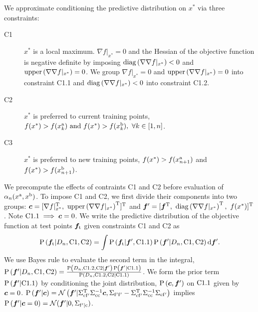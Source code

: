 We approximate conditioning the predictive distribution on $x^*$ via three
constraints: 
\begin{description} 
    \item[C1] $x^*$ is a local maximum. $\nabla f|_{x^*} = 0$ and the
    Hessian of the objective function is negative definite by imposing
    $\func{diag}{\nabla \nabla f|_{x^*}} < 0$ and $\func{upper}{\nabla
    \nabla f|_{x^*}} = 0$. We group $\nabla f|_{x^*} = 0$ and
    $\func{upper}{\nabla \nabla f|_{x^*}} = 0$ into constraint C1.1 and
    $\func{diag}{\nabla \nabla f|_{x^*}} < 0$ into constraint C1.2.

    \item[C2] $x^*$ is preferred to current training points, $f(x^*) >
    f(x_k^{\mathrm{a}}) \textrm{ and }  f(x^*) > f(x_k^{\mathrm{b}}), \ \forall k \in [1,
    n]$.

    \item[C3] $x^*$ is preferred to new training points, $f(x^*) >
    f(x_{n+1}^{\mathrm{a}})$ and $f(x^*) > f(x_{n+1}^{\mathrm{b}})$.  
\end{description}

We precompute the effects of contraints C1 and C2 before evaluation of
$\funcil{\alpha}[n]{x^\tn{a}, x^\tn{b}}$. To impose C1 and C2, we first divide
their components into two groups: $\vecf{c} = [\nabla f|_{x^*}^\tn{T}, \
\func{upper}{\nabla \nabla f|_{x^*}}^\tn{T}]^\tn{T}$ and $\vecf{f}' =
[\vecf{f}^\tn{T},\ \func{diag}{\nabla \nabla f|_{x^*}}^\tn{T},\
f(x^*)]^\tn{T}$. Note $\tn{C1.1} \implies \vecf{c} = 0$. We write the predictive
distribution of the objective function at test points $\vecf{f}[\tn{t}]$ given
constraints C1 and C2 as
\begin{align}
    \prob{\vecf{f}[\tn{t}]|D_n, \tn{C1},\tn{C2}} = 
    \int\prob{\vecf{f}[\tn{t}]| \vecf{f}', \tn{C1.1}}  
    \prob{\vecf{f}' | D_n, \tn{C1}, \tn{C2}} \tn{d}\vecf{f}'.
    \label{eq:predictive_w_constraints}
\end{align}
We use Bayes rule to evaluate the second term in the integral, $\prob{\vecf{f}'
| D_n, \tn{C1}, \tn{C2}} = \frac{\prob{D_n , \tn{C1.2}, \tn{C2} |\vecf{f}'}
\prob{\vecf{f}'| \tn{C1.1}}}{\prob{D_n, \tn{C1.2}, \tn{C2} | \tn{C1.1}}}$. We
form the prior term $\prob{\vecf{f}'|\tn{C1.1}}$ by conditioning the joint
distribution, $\prob{\vecf{c}, \vecf{f}'}$  on $\mathrm{C1.1}$ given by $\vecf{c} =
0$. $\prob{\vecf{f}'|\vecf{c}} = \mathcal{N}\left( \vecf{f}'|
\Sigma_\tn{cf'}^\tn{T} \Sigma_\tn{cc}^{-1} \vecf{c}, \Sigma_\tn{f'f'} -
\Sigma_\tn{cf'}^\tn{T} \Sigma_\tn{cc}^{-1} \Sigma_\tn{cf'} \right)$ implies
$\prob{\vecf{f}'|\vecf{c}=0} = \mathcal{N}(\vecf{f}'| 0, \Sigma_\tn{f'|c})$.

